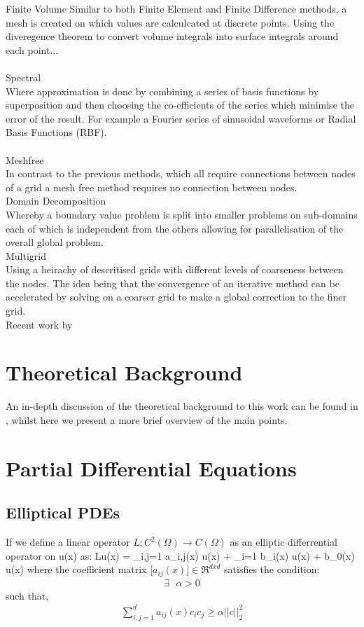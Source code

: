 \documentclass[a4paper]{amsart}
\begin{document}
\textperiodcentered Finite Volume
Similar to both Finite Element and Finite Difference methods, a mesh is created on which values are calculcated at discrete points. Using the diveregence theorem to convert volume integrals into surface integrals around each point...\\
\\ 
\textperiodcentered Spectral\\
Where approximation is done by combining a series of basis functions by superposition and then choosing the co-efficients of the series which minimise the error of the result. For example a Fourier series of sinusoidal waveforms or Radial Basis Functions (RBF).\\
\\ 
\textperiodcentered Meshfree\\
In contrast to the previous methods, which all require connections between nodes of a grid a mesh free method requires no connection between nodes.
\\ 
\textperiodcentered Domain Decomposition\\
Whereby a boundary value problem is split into smaller problems on sub-domains each of which is independent from the others allowing for parallelisation of the overall global problem.
\\ 
\textperiodcentered Multigrid\\
Using a heirachy of descritised grids with different levels of coarseness between the nodes. The idea being that the convergence of an iterative method can be accelerated by solving on a coarser grid to make a global correction to the finer grid.
\\
Recent work by

\section{Theoretical Background}
An in-depth discussion of the theoretical background to this work can be found in \cite{mski0}, whilst here we present a more brief overview of the main points.

\section{Partial Differential Equations}

\subsection{Elliptical PDEs}
If we define a linear operator $L : C^{2} (\Omega) \rightarrow C(\Omega)$ as an elliptic differrential operator on u(x) as:
\be
Lu(x) = \sum_{i,j=1} a_{i,j}(x)  u(x) + \sum_{i=1} b_{i}(x)  u(x) + b_{0}(x) u(x)
\label{EPDE}
\ee
where the coefficient matrix $\big[ a_{ij}(x) \big] \in \Re^{dxd}$ satisfies the condition:
\begin{align*}
\exists \mbox{  } \alpha > 0
\end{align*}
 such that,
\begin{align*}
\sum_{i,j=1}^{d} a_{ij}(x)c_{i}c_{j}\geq \alpha||c||_{2}^{2}
\end{align*}
\end{document}
